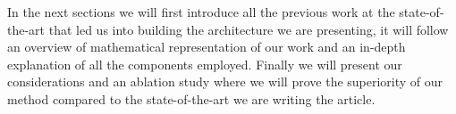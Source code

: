 In the next sections we will first introduce all the previous work at the state-of-the-art that led us into building the  architecture we are presenting, it will follow an overview of mathematical representation of our work and an in-depth explanation of all the components employed. 
Finally we will present our considerations and an ablation study where we will prove the superiority of our method compared to the state-of-the-art we are writing the article.